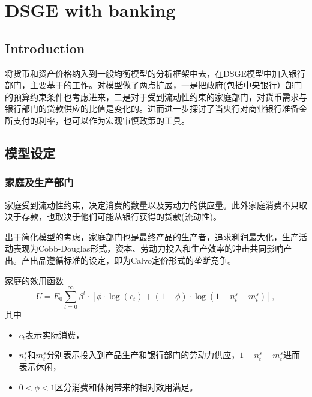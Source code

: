 \chapter{DSGE with banking}
\label{sec:BDSGE}

\section{Introduction}


将货币和资产价格纳入到一般均衡模型的分析框架中去，在DSGE模型中加入银行部门，主要基于\cite{Goodfriend:2007fq, Gilchrist:2007iv}的工作。\cite{Chadha:2008uh}对模型做了两点扩展，一是把政府(包括中央银行）部门的预算约束条件也考虑进来，二是对于受到流动性约束的家庭部门，对货币需求与银行部门的贷款供应的比值是变化的。进而\cite{Chadha:2012jl}进一步探讨了当央行对商业银行准备金所支付的利率，也可以作为宏观审慎政策的工具。

\section{模型设定}

\subsection{家庭及生产部门}
家庭受到流动性约束，决定消费的数量以及劳动力的供应量。此外家庭消费不只取决于存款，也取决于他们可能从银行获得的贷款(流动性)。

出于简化模型的考虑，家庭部门也是最终产品的生产者，追求利润最大化，生产活动表现为Cobb-Douglas形式，资本、劳动力投入和生产效率的冲击共同影响产出。产出品遵循标准的\cite{Yun:1996tx}设定，即为Calvo定价形式的垄断竞争\citep{Calvo:1983uq}。

家庭的效用函数
\begin{equation}
\label{eq:hh-utility-fu}
U = E_0 \sum_{t=0}^{\infty} \beta^t \cdot \left[ \phi \cdot \log (c_t) + (1-\phi) \cdot \log(1-n_t^s - m_t^s) \right],
\end{equation}
其中
\begin{itemize}
  \item $c_t$表示实际消费，
  \item $n_t^s$和$m_t^s$分别表示投入到产品生产和银行部门的劳动力供应，$1-n_t^s - m_t^s$进而表示休闲，
  \item $0<\phi<1$区分消费和休闲带来的相对效用满足。
\end{itemize}

